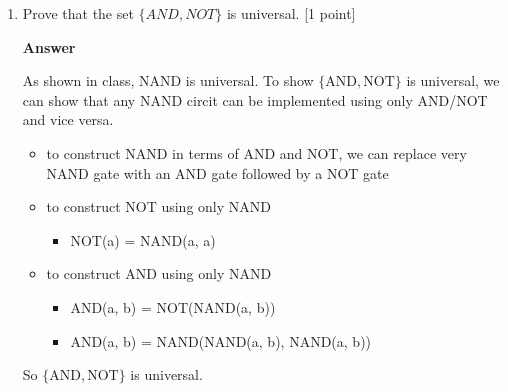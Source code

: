 \documentclass[11pt]{article}
\newcommand \kw[1]{\textbf{#1}}
\newenvironment{answer}{
\vspace{.5cm}
\kw{Answer}
}
{

}
\begin{document}
\begin{enumerate}
\begin{answer}
In order to decode:
\begin{itemize}
    \item keep reading until 01 reached
    \item chop the part that was read off and decode the numbers using standard PFE decoder for natural numbers to get a list of neighbors in ith index
    \item draw graph w/ edges to neighbors indicated by list
    \item repeat until all bits have been read
\end{itemize}

To count the number of bits:
\begin{itemize}
    \item for $n \in N, |E(n)| = log_2(n)$
    \item the PFE of each number will take $log_2(n) + 2log_2(log_2(n)) + 2$ bits (this is the length of the more efficient PFE discussed briefly in class)
    \item so each list will be $10(log_2(n) + 2log_2(log_2(n)) + 2)$ bits
    \item the PFE of a list will then be $10(log_2(n) + 2log_2(log_2(n)) + 2) + 2log_2(10(log_2(n) + 2log_2(log_2(n)) + 2)) + 2$ bits
    \item so in total we have $n(10(log_2(n) + 2log_2(log_2(n)) + 2) + 2log_2(10(log_2(n) + 2log_2(log_2(n)) + 2)) + 2)$ bits since we have n lists 
    \item this is less than $1000nlog_2n$ for sufficiently large n 
\end{itemize}

\qed
\end{answer}

\pagebreak

\item Prove that the set $\{AND,NOT\}$ is universal. [1 point] 

\begin{answer}
As shown in class, NAND is universal. To show $\{\text{AND},\text{NOT}\}$ is universal, we can show that any NAND circit can be implemented using only AND/NOT and vice versa.
\begin{itemize}
    \item to construct NAND in terms of AND and NOT, we can replace very NAND gate with an AND gate followed by a NOT gate
    \item to construct NOT using only NAND
    \begin{itemize}
        \item NOT(a) = NAND(a, a)
    \end{itemize}
    \item to construct AND using only NAND
    \begin{itemize}
        \item AND(a, b) = NOT(NAND(a, b))
        \item AND(a, b) = NAND(NAND(a, b), NAND(a, b))
    \end{itemize}
\end{itemize}
So $\{\text{AND},\text{NOT}\}$ is universal. 


\end{answer}
\end{enumerate}
\end{document}
